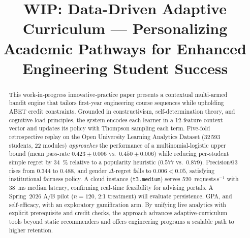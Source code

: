 \documentclass[conference]{IEEEtran}
\begin{document}
\title{WIP: Data-Driven Adaptive Curriculum — Personalizing Academic Pathways for Enhanced Engineering Student Success}
\author{
\and
{}
\and
{}
\and
{}
}
\maketitle


\begin{abstract}
This work‐in‐progress innovative‐practice paper presents a contextual
multi-armed bandit engine that tailors first-year engineering course
sequences while upholding ABET credit constraints.  Grounded in constructivism, self-determination theory, and cognitive-load principles, the system encodes each learner in a 12-feature context vector and updates its
policy with Thompson sampling each term.  
Five-fold retrospective replay on the Open University Learning Analytics
Dataset (32\,593 students, 22 modules) \emph{approaches} the performance of a multinomial-logistic upper bound (mean pass-rate
$0.423\!\pm\!0.006$ vs.\ $0.450\!\pm\!0.006$) while reducing per-student
simple regret by 34~\% relative to a popularity heuristic
($0.577$ vs.\ $0.879$).  
Precision@3 rises from $0.344$ to $0.488$, and gender
$\Delta$-regret falls to $0.006<0.05$, satisfying institutional fairness
policy.  A cloud instance (\texttt{t3.medium}) serves
520~requests\,s$^{-1}$ with 38~ms median latency, confirming real-time feasibility for advising portals.  
A Spring~2026 A/B pilot ($n{=}120$, 2:1 treatment) will evaluate persistence, GPA, and self-efficacy, with an exploratory gamification arm.  
By unifying live analytics with explicit prerequisite and credit checks, the approach advances adaptive-curriculum tools beyond static recommenders and offers engineering programs a scalable path to higher retention.
\end{abstract}
\end{document}
